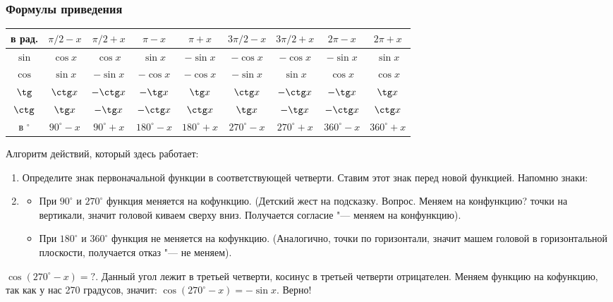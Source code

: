 \begin{absolutelynopagebreak}
\subsubsection{Формулы приведения}
\tiny
\begin{longtable}{|c|c|c|c|c|c|c|c|c|}
\hline
в рад.
&
$\pi/2-x$
&
$\pi/2+x$
&
$\pi-x$
&
$\pi+x$
&
$3\pi/2-x$
&
$3\pi/2+x$
&
$2\pi-x$
&
$2\pi+x$
\\\hline
$\sin$
&
$\cos x$
&
$\cos x$
&
$\sin x$
&
$-\sin x$
&
$-\cos x$
&
$-\cos x$
&
$-\sin x$
&
$\sin x$
\\\hline
$\cos$
&
$\sin x$
&
$-\sin x$
&
$-\cos x$
&
$-\cos x$
&
$-\sin x$
&
$\sin x$
&
$\cos x$
&
$\cos x$
\\\hline
$\tg$
&
$\ctg x$
&
$-\ctg x$
&
$-\tg x$
&
$\tg x$
&
$\ctg x$
&
$-\ctg x$
&
$-\tg x$
&
$\tg x$
\\\hline
$\ctg$
&
$\tg x$
&
$-\tg x$
&
$-\ctg x$
&
$\ctg x$
&
$\tg x$
&
$-\tg x$
&
$-\ctg x$
&
$\ctg x$
\\\hline
в $^{\circ}$
&
$90^{\circ}-x$
&
$90^{\circ}+x$
&
$180^{\circ}-x$
&
$180^{\circ}+x$
&
$270^{\circ}-x$
&
$270^{\circ}+x$
&
$360^{\circ}-x$
&
$360^{\circ}+x$
\\\hline
\end{longtable}
\end{absolutelynopagebreak}
\normalsize 
Алгоритм действий, который здесь работает:
\begin{enumerate}
\item
Определите знак первоначальной функции в соответствующей четверти. Ставим этот знак перед новой функцией. Напомню знаки:
\item
\begin{itemize}
\item 
При $90^{\circ}$ и $270^{\circ}$ функция меняется на кофункцию. (Детский жест на подсказку. Вопрос. Меняем на конфункцию? точки на вертикали, значит головой киваем сверху вниз. Получается согласие \grqq "--- меняем на конфункцию).
\item
При $180^{\circ}$ и $360^{\circ}$ функция не меняется на кофункцию. (Аналогично, точки по горизонтали, значит машем головой в горизонтальной плоскости, получается отказ \grqq "--- не меняем).
\end{itemize}
\end{enumerate}

\begin{exmpl}
$\cos(270^{\circ}-x)=?$. Данный угол лежит в третьей четверти, косинус в третьей четверти отрицателен. Меняем функцию на кофункцию, так как у нас 270 градусов, значит: $\cos(270^{\circ}-x)=-\sin x$. Верно!
\end{exmpl}

